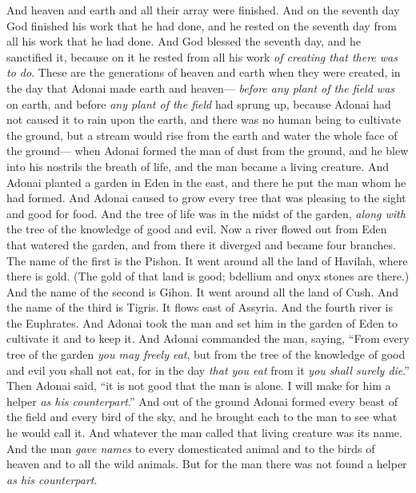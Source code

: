 \begin{biblechapter} %
\verse And heaven and earth and all their array were finished.
\verse And on the seventh day God finished his work that he had done, and he rested on the seventh day from all his work that he had done.
\verse And God blessed the seventh day, and he sanctified it, because on it he rested from all his work \textit{of creating that there was to do}.
 These are the generations of heaven and earth when they were created, in the day that Adonai made earth and heaven—
\verse \textit{before any plant of the field was} on earth, and before \textit{any plant of the field} had sprung up, because Adonai had not caused it to rain upon the earth, and there was no human being to cultivate the ground,
\verse but a stream would rise from the earth and water the whole face of the ground—
\verse when Adonai formed the man of dust from the ground, and he blew into his nostrils the breath of life, and the man became a living creature.
\verse And Adonai planted a garden in Eden in the east, and there he put the man whom he had formed.
\verse And Adonai caused to grow every tree that was pleasing to the sight and good for food. And the tree of life was in the midst of the garden, \textit{along with} the tree of the knowledge of good and evil.
\verse Now a river flowed out from Eden that watered the garden, and from there it diverged and became four branches.
\verse The name of the first is the Pishon. It went around all the land of Havilah, where there is gold.
\verse (The gold of that land is good; bdellium and onyx stones are there.)
\verse And the name of the second is Gihon. It went around all the land of Cush.
\verse And the name of the third is Tigris. It flows east of Assyria. And the fourth river is the Euphrates.
\verse And Adonai took the man and set him in the garden of Eden to cultivate it and to keep it.
\verse And Adonai commanded the man, saying, “From every tree of the garden \textit{you may freely eat},
\verse but from the tree of the knowledge of good and evil you shall not eat, for in the day \textit{that you eat} from it \textit{you shall surely die}.”
\verse Then Adonai said, “it is not good that the man is alone. I will make for him a helper \textit{as his counterpart}.”
\verse And out of the ground Adonai formed every beast of the field and every bird of the sky, and he brought each to the man to see what he would call it. And whatever the man called that living creature was its name.
\verse And the man \textit{gave names} to every domesticated animal and to the birds of heaven and to all the wild animals. But for the man there was not found a helper \textit{as his counterpart}.

\end{biblechapter}
